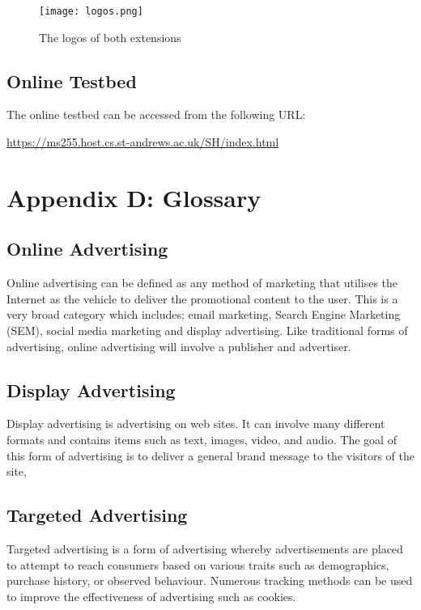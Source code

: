 \documentclass[12pt]{article}
\begin{document}
\begin{figure}[H]
    \centering
    \texttt{[image: logos.png]}
    \caption{The logos of both extensions}
    \label{fig:logos}
\end{figure}

\subsection{Online Testbed}
The online testbed can be accessed from the following URL: 
\begin{center}
\url{https://ms255.host.cs.st-andrews.ac.uk/SH/index.html}
\end{center}

\section{Appendix D: Glossary} \label{glossary}

\subsection{Online Advertising}
Online advertising can be defined as any method of marketing that utilises the Internet as the vehicle to deliver the promotional content to the user. This is a very broad category which includes; email marketing, Search Engine Marketing (SEM), social media marketing and display advertising. Like traditional forms of advertising, online advertising will involve a publisher and advertiser. 

\subsection{Display Advertising}
Display advertising is advertising on web sites. It can involve many different formats and contains items such as text, images, video, and audio. The goal of this form of advertising is to deliver a general brand message to the visitors of the site,

\subsection{Targeted Advertising}
Targeted advertising is a form of advertising whereby advertisements are placed to attempt to reach consumers based on various traits such as demographics, purchase history, or observed behaviour. Numerous tracking methods can be used to improve the effectiveness of advertising such as cookies. 
\end{document}
